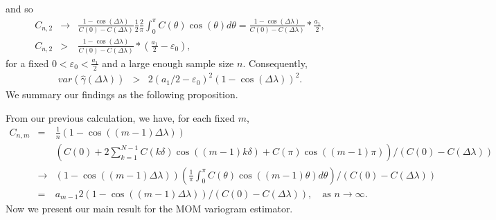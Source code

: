 and so
\begin{eqnarray*}
C_{n, 2} &\to& \frac{1 - \cos(\Delta \lambda)}{C(0) - C(\Delta \lambda)} \frac{1}{2} \frac{2}{\pi}\int_0^\pi C(\theta)\cos(\theta)d\theta = \frac{1 - \cos(\Delta \lambda)}{C(0) - C(\Delta \lambda)}*\frac{a_1}{2}, \\
C_{n, 2} &>& \frac{1 - \cos(\Delta \lambda)}{C(0) - C(\Delta \lambda)}*(\frac{a_1}{2} - \varepsilon_0),
\end{eqnarray*}
for a fixed $0 < \varepsilon_0 < \frac{a_1}{2}$ and a large enough sample size $n$. Consequently,
\begin{eqnarray*}
var(\hat{\gamma}(\Delta \lambda)) &>& 2(a_1/2 - \varepsilon_0)^2(1 - \cos(\Delta \lambda))^2.
\end{eqnarray*}
We summary our findings as the following proposition.


From our previous calculation, we have, for each fixed $m$,
\begin{eqnarray*}
C_{n, m} &=& \frac{1}{n}(1 - \cos((m-1)\Delta \lambda)) \\
& &\left(C(0) + 2\sum_{k = 1}^{N-1}C(k\delta)\cos((m-1)k\delta) + C(\pi)\cos((m-1)\pi)\right)/(C(0)-C(\Delta \lambda)) \\
& \to & (1 - \cos((m-1)\Delta \lambda)) \left(\frac{1}{\pi}\int_0^\pi C(\theta)\cos((m-1)\theta)d\theta\right)/(C(0)-C(\Delta \lambda)) \\
&=& {a_{m-1}}{2}(1 - \cos((m-1)\Delta \lambda))/(C(0)-C(\Delta \lambda)), \quad \mbox{as $n \to \infty$.}
\end{eqnarray*}
Now we present our main result for the MOM variogram estimator.


